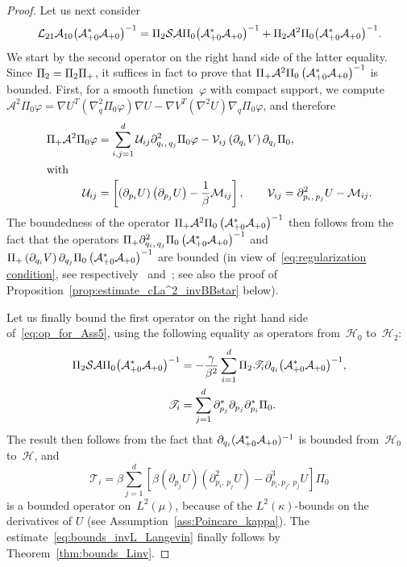 \documentclass[10pt,a4paper]{article}
\numberwithin{equation}{section}
\newcommand{\cL}{\mathcal{L}}
\newcommand{\cLs}{\mathcal{S}}
\newcommand{\cLa}{\mathcal{A}}
\newcommand{\cH}{\mathcal{H}}
\newcommand{\cLM}{\mathcal{M}}
\newcommand{\cLU}{\mathcal{U}}
\newcommand{\clV}{\mathcal{V}}
\newcommand{\scrT}{\mathscr{T}}
\newcommand{\subplus}{\textnormal{\texttt{+}}}
\begin{document}
\begin{proof}
Let us next consider
\begin{equation}\label{eq:op_for_Ass5}
\cL_{21}\cLa_{10} \big(\cLa_{\subplus 0}^*\cLa_{\subplus 0}\big)^{-1} = \Pi_2 \cLs \cLa \Pi_0 \big(\cLa_{\subplus 0}^*\cLa_{\subplus 0}\big)^{-1} + \Pi_2 \cLa^2 \Pi_0 \big(\cLa_{\subplus 0}^*\cLa_{\subplus 0}\big)^{-1}.
\end{equation}
We start by the second operator on the right hand side of the latter equality. Since $\Pi_2 = \Pi_2 \Pi_\subplus$, it suffices in fact to prove that $\Pi_\subplus\cLa^2 \Pi_0 \left(\cLa_{\subplus 0}^*\cLa_{\subplus 0}\right)^{-1}$ is bounded. First, for a smooth function~$\varphi$ with compact support, we compute $\cLa^2\Pi_0\varphi = \nabla U^T(\nabla^2_q \Pi_0 \varphi) \nabla U - \nabla V^T (\nabla^2 U) \nabla_q \Pi_0\varphi$, and therefore
\begin{align}
\Pi_\subplus\cLa^2 \Pi_0 \varphi &= \sum_{i,j=1}^d \cLU_{ij} \partial^2_{q_i,\,q_j} \Pi_0 \varphi - \clV_{ij} \left(\partial_{q_i} V\right) \partial_{q_j} \Pi_0,\label{eq:action_cLa2}
\\
\intertext{with}
\cLU_{ij} &= \left[\left(\partial_{p_i} U\right)\left(\partial_{p_j} U\right)-\frac1\beta \cLM_{ij}\right],
\qquad
\clV_{ij} = \partial^2_{p_i,\,p_j}U - \cLM_{ij}.\label{eq:Sij_Tij}
\end{align}
The boundedness of the operator $\Pi_\subplus\cLa^2 \Pi_0
\left(\cLa_{\subplus 0}^*\cLa_{\subplus 0}\right)^{-1}$ then follows from the fact that the operators $\Pi_\subplus\partial^2_{q_i,\,q_j} \Pi_0
\left(\cLa_{\subplus 0}^*\cLa_{\subplus 0}\right)^{-1}$ and $\Pi_\subplus\left(\partial_{q_i} V\right) \partial_{q_j} \Pi_0
\left(\cLa_{\subplus 0}^*\cLa_{\subplus 0}\right)^{-1}$ are bounded (in view of~\eqref{eq:regularization condition}, see respectively~\cite[Proposition~5]{DMS15} and~\cite[Lemma~A.4]{ST18}; see also the proof of Proposition~\ref{prop:estimate_cLa^2_invBBstar} below).

Let us finally bound the first operator on the right hand side of~\eqref{eq:op_for_Ass5}, using the following equality as operators from~$\cH_0$ to~$\cH_2$:
\begin{align*}
\Pi_2 \cLs \cLa \Pi_0 \big(\cLa_{\subplus 0}^*\cLa_{\subplus 0}\big)^{-1} & = -\frac{\gamma}{\beta^2} \sum_{i=1}^d \Pi_2 \scrT_{i} \partial_{q_i} \big(\cLa_{\subplus 0}^*\cLa_{\subplus 0}\big)^{-1},
\\
\scrT_i &= \sum_{j=1}^d \partial_{p_j}^* \partial_{p_j} \partial_{p_i}^* \Pi_0.
\end{align*}
The result then follows from the fact that $\partial_{q_i} (\cLa_{\subplus 0}^*\cLa_{\subplus 0})^{-1}$ is bounded from~$\cH_0$ to~$\cH$, and
\[
\scrT_i = \beta \sum_{j=1}^d \left[\beta \left(\partial_{p_j}U\right)\left(\partial^2_{p_i,\,p_j}U\right) -\partial^3_{p_i, p_j,\,p_j} U\right] \Pi_0
\]
is a bounded operator on~$L^2(\mu)$, because of the $L^2(\kappa)$-bounds on the derivatives of $U$ (see Assumption~\ref{ass:Poincare_kappa}). The estimate~\eqref{eq:bounds_invL_Langevin} finally follows by Theorem~\ref{thm:bounds_Linv}.
\end{proof}
\end{document}
